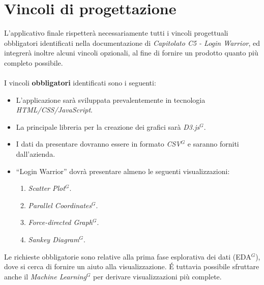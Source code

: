 \section{Vincoli di progettazione}

L'applicativo finale rispetterà necessariamente tutti i vincoli progettuali obbligatori identificati nella documentazione di \textit{Capitolato C5 - Login Warrior}, ed integrerà inoltre alcuni vincoli opzionali, al fine di fornire un prodotto quanto più completo possibile. \\ \\
I vincoli \textbf{obbligatori} identificati sono i seguenti:
\begin{itemize}
	\item L’applicazione sarà sviluppata prevalentemente in tecnologia \textit{HTML/CSS/JavaScript}.
	\item La principale libreria per la creazione dei grafici sarà \textit{D3.js$^{G}$}.
	\item I dati da presentare dovranno essere in formato \textit{CSV$^{G}$} e saranno forniti 
			dall'azienda.
	\item “Login Warrior” dovrà presentare almeno le seguenti visualizzazioni:
		 \begin{enumerate}
                    \item \textit{Scatter Plot$^{G}$}.
                    \item \textit{Parallel Coordinates$^{G}$}.
                    \item \textit{Force-directed Graph$^{G}$}.
                    \item \textit{Sankey Diagram$^{G}$}.
		\end{enumerate}
\end{itemize}

\noindent
Le richieste obbligatorie sono relative alla prima fase esplorativa dei dati (EDA$^{G}$), dove si cerca di fornire un aiuto alla visualizzazione. \' E tuttavia possibile sfruttare anche il \textit{Machine Learning$^{G}$} per derivare visualizzazioni più complete.

